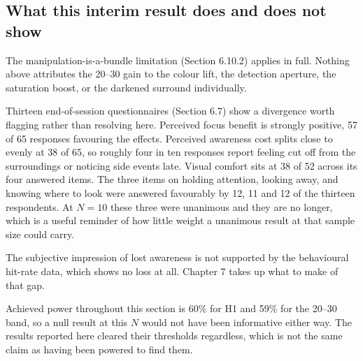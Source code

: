 \subsection{What this interim result does and does not show}

The manipulation-is-a-bundle limitation (Section 6.10.2) applies in full. Nothing above attributes the
20--30\textdegree{} gain to the colour lift, the detection aperture, the saturation boost, or the
darkened surround individually.

Thirteen end-of-session questionnaires (Section 6.7) show a divergence worth flagging rather than
resolving here. Perceived focus benefit is strongly positive, 57 of 65 responses favouring the
effects. Perceived awareness cost splits close to evenly at 38 of 65, so roughly four in ten responses
report feeling cut off from the surroundings or noticing side events late. Visual comfort sits at 38
of 52 across its four answered items. The three items on holding attention, looking away, and knowing
where to look were answered favourably by 12, 11 and 12 of the thirteen respondents. At $N = 10$ these
three were unanimous and they are no longer, which is a useful reminder of how little weight a
unanimous result at that sample size could carry.

The subjective impression of lost awareness is not supported by the behavioural hit-rate data, which
shows no loss at all. Chapter 7 takes up what to make of that gap.


Achieved power throughout this section is 60\% for H1 and 59\% for the 20--30\textdegree{} band, so a
null result at this $N$ would not have been informative either way. The results reported here cleared
their thresholds regardless, which is not the same claim as having been powered to find them.
